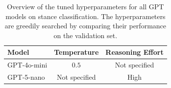 \begin{table}[htbp]
\centering
\begin{tabular}{lcc}
\toprule
Model & Temperature & Reasoning Effort \\
\midrule
GPT-4o-mini & $0.5$ & Not specified \\
GPT-5-nano & Not specified & High \\
\bottomrule
\end{tabular}
\caption[Tuned hyperparameters for GPT models on stance classification]{Overview of the tuned hyperparameters for all GPT models on stance classification. The hyperparameters are greedily searched by comparing their performance on the validation set.}\label{tab:tuned_hyperparams_genllm_stance}
\end{table}